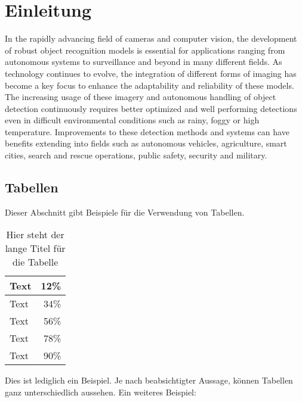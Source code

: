 \chapter{Einleitung}
\label{cha:Einleitung}

In the rapidly advancing field of cameras and computer vision, the development of robust object recognition models is essential for applications ranging from autonomous systems to surveillance and beyond in many different fields. As technology continues to evolve, the integration of different forms of imaging has become a key focus to enhance the adaptability and reliability of these models. The increasing usage of these imagery and autonomous handling of object detection continuously requires better optimized and well performing detections even in difficult environmental conditions such as rainy, foggy or high temperature. Improvements to these detection methods and systems can have benefits extending into fields such as autonomous vehicles, agriculture, smart cities, search and rescue operations, public safety, security and military. 






\section{Tabellen}
\label{sec:Tabellen}
Dieser Abschnitt gibt Beispiele für die Verwendung von Tabellen.

\begin{table}[ht]
    \vspace{0.5em}
	\centering
	\begin{tabular}{|l|r|}
        \hline
        Text & 12\% \\
        \hline
        Text & 34\% \\
        \hline
        Text & 56\% \\
        \hline
        Text & 78\% \\
        \hline
        Text & 90\% \\
        \hline
	\end{tabular}
	\caption[Kurztitel Tabelle]{Hier steht der lange Titel für die Tabelle}
	\label{tab:tabelle}
	\vspace{0.5em}
\end{table}

\noindent{}Dies ist lediglich ein Beispiel. Je nach beabsichtigter Aussage, können Tabellen ganz unterschiedlich aussehen. Ein weiteres Beispiel:

